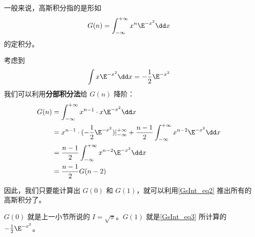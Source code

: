 一般来说，高斯积分指的是形如
\begin{equation}
G(n)=\int_{-\infty}^{+\infty} x^n\E^{-x^2}\dd x
\end{equation}
的定积分。

考虑到
\begin{equation}\label{GsInt_eq3}
\int x\E^{-x^2}\dd x=-\frac{1}{2}\E^{-x^2}
\end{equation}
我们可以利用\textbf{分部积分法}给 $G(n)$ 降阶：
\begin{equation}\label{GsInt_eq2}
\begin{aligned}
G(n)&=\int_{-\infty}^{+\infty} x^{n-1}\cdot x\E^{-x^2}\dd x\\
&=x^{n-1}\cdot(-\frac{1}{2}\E^{-x^2})|_{-\infty}^{+\infty}+\frac{n-1}{2}\int_{-\infty}^{+\infty} x^{n-2}\E^{-x^2}\dd x\\
&=\frac{n-1}{2}\int_{-\infty}^{+\infty} x^{n-2}\E^{-x^2}\dd x\\
&=\frac{n-1}{2}G(n-2)
\end{aligned}
\end{equation}

因此，我们只要能计算出 $G(0)$ 和 $G(1)$，就可以利用\autoref{GsInt_eq2} 推出所有的高斯积分了。

$G(0)$ 就是上一小节所说的 $I=\sqrt{\pi}$。$G(1)$ 就是\autoref{GsInt_eq3} 所计算的 $-\frac{1}{2}\E^{-x^2}$。









